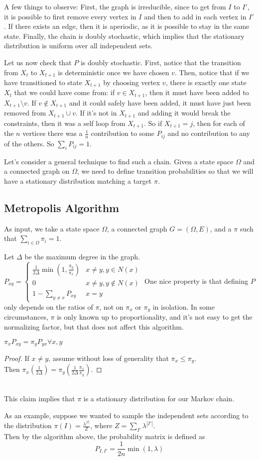 A few things to observe: First, the graph is irreducible, since to get from $I$ to $I'$, it is possible to first remove every vertex in $I$ and then to add in each vertex in $I'$. If there exists an edge, then it is aperiodic, as it is possible to stay in the same state. Finally, the chain is doubly stochastic, which implies that the stationary distribution is uniform over all independent sets.

Let us now check that $P$ is doubly stochastic. First, notice that the transition from $X_t$ to $X_{t+1}$ is deterministic once we have chosen $v$. Then, notice that if we have transitioned to state $X_{t+1}$ by choosing vertex $v$, there is exactly one state $X_t$ that we could have come from: if $v \in X_{t+1}$, then it must have been added to $X_{t+1} \setminus v$. If $v \notin X_{t+1}$ and it could safely have been added, it must have just been removed from $X_{t+1} \cup v$. If it's not in $X_{t+1}$ and adding it would break the constraints, then it was a self loop from $X_{t+1}$. So if $X_{t+1} = j$, then for each of the $n$ vertices there was a $\frac{1}{n}$ contribution to some $P_{ij}$ and no contribution to any of the others. So $\sum_i P_{ij} = 1$.

\bigskip

Let's consider a general technique to find such a chain. Given a state space $\Omega$ and a connected graph on $\Omega$, we need to define transition probabilities so that we will have a stationary distribution matching a target $\pi$.

\subsection{Metropolis Algorithm}
As input, we take a state space $\Omega$, a connected graph $G = (\Omega, E)$, and a $\pi$ such that $\sum_{i \in \Omega} \pi_i = 1$.

Let $\Delta$ be the maximum degree in the graph. \\
$P_{xy} = \begin{cases}
\frac{1}{2\Delta}\min(1, \frac{\pi_y}{\pi_x}) & x \neq y, y \in N(x) \\
0 & x \neq y, y \notin N(x) \\
1 - \sum_{y\neq x} P_{xy} & x = y
\end{cases}$
One nice property is that defining $P$ only depends on the ratios of $\pi$, not on $\pi_x$ or $\pi_y$ in isolation. In some circumstances, $\pi$ is only known up to proportionality, and it's not easy to get the normalizing factor, but that does not affect this algorithm.
\begin{claim}
$ \pi_x P_{xy} = \pi_y P_{yx} \forall x, y$
  \end{claim}
\begin{proof}
If $x \neq y$, assume without loss of generality that $\pi_x \leq \pi_y$. \\
  Then $\pi_x(\frac{1}{2\Delta}) = \pi_y(\frac{1}{2\Delta}\frac{\pi_x}{\pi_y})$.
\end{proof} \\
This claim implies that $\pi$ is a stationary distribution for our Markov chain.
\bigskip

As an example, suppose we wanted to sample the independent sets according to the distribution $\pi(I) = \frac{\lambda^{|I|}}{Z}$, where $Z = \sum_{I'} \lambda^{|I'|}$. \\ 
Then by the algorithm above, the probability matrix is defined as
\[ P_{I, I'} = \frac{1}{2n}\min(1, \lambda) \]
